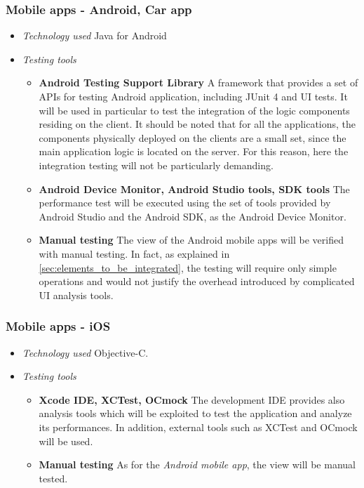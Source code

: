 	\subsubsection*{Mobile apps - Android, Car app}
	\label{sec:tools_android_apps}
	\begin{itemize}[label={},leftmargin=*,noitemsep,topsep=0pt]
		\item \textit{Technology used} Java for Android
		\item \textit{Testing tools}
			\begin{itemize}[label={},noitemsep]
				\item \textbf{Android Testing Support Library} A framework that provides a set of APIs for testing Android application, including JUnit 4 and UI tests. It will be used in particular to test the integration of the logic components residing on the client. It should be noted that for all the applications, the components physically deployed on the clients are a small set, since the main application logic is located on the server. For this reason, here the integration testing will not be particularly demanding.
				\item \textbf{Android Device Monitor, Android Studio tools, SDK tools} The performance test will be executed using the set of tools provided by Android Studio and the Android SDK, as the Android Device Monitor.
				\item \textbf{Manual testing} The view of the Android mobile apps will be verified with manual testing. In fact, as explained in \autoref{sec:elements_to_be_integrated}, the testing  will require only simple operations and would not justify the overhead introduced by complicated UI analysis tools.
			\end{itemize}
	\end{itemize}

	\subsubsection*{Mobile apps - iOS}
		\begin{itemize}[label={},leftmargin=*,noitemsep,topsep=0pt]
			\item \textit{Technology used} Objective-C.
			\item \textit{Testing tools}
				\begin{itemize}[label={},noitemsep]
					\item \textbf{Xcode IDE, XCTest, OCmock} The development IDE provides also analysis tools which will be exploited to test the application and analyze its performances. In addition, external tools such as XCTest and OCmock will be used.
					\item \textbf{Manual testing} As for the \textit{Android mobile app}, the view will be manual tested.
				\end{itemize}
		\end{itemize}

